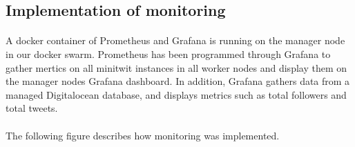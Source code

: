 \subsection{Implementation of monitoring} 
\paragraph{} A docker container of Prometheus and Grafana is running on the manager node in our docker swarm. Prometheus has been programmed through Grafana to gather mertics on all minitwit instances in all worker nodes and display them on the manager nodes Grafana dashboard. In addition, Grafana gathers data from a managed Digitalocean database, and displays metrics such as total followers and total tweets.
\paragraph{} The following figure describes how monitoring was implemented.